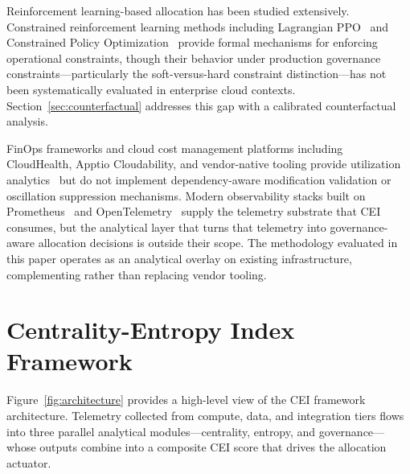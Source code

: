 \documentclass[runningheads]{llncs}
\begin{document}
Reinforcement learning-based allocation has been studied extensively. Constrained reinforcement learning methods including Lagrangian PPO~\cite{schulman} and Constrained Policy Optimization~\cite{achiam} provide formal mechanisms for enforcing operational constraints, though their behavior under production governance constraints---particularly the soft-versus-hard constraint distinction---has not been systematically evaluated in enterprise cloud contexts. Section~\ref{sec:counterfactual} addresses this gap with a calibrated counterfactual analysis.

FinOps frameworks and cloud cost management platforms including CloudHealth, Apptio Cloudability, and vendor-native tooling provide utilization analytics~\cite{finops} but do not implement dependency-aware modification validation or oscillation suppression mechanisms. Modern observability stacks built on Prometheus~\cite{prometheus_observability} and OpenTelemetry~\cite{open_telemetry} supply the telemetry substrate that CEI consumes, but the analytical layer that turns that telemetry into governance-aware allocation decisions is outside their scope. The methodology evaluated in this paper operates as an analytical overlay on existing infrastructure, complementing rather than replacing vendor tooling.

\section{Centrality-Entropy Index Framework}
\label{sec:framework}

Figure~\ref{fig:architecture} provides a high-level view of the CEI framework architecture. Telemetry collected from compute, data, and integration tiers flows into three parallel analytical modules---centrality, entropy, and governance---whose outputs combine into a composite CEI score that drives the allocation actuator.
\end{document}
